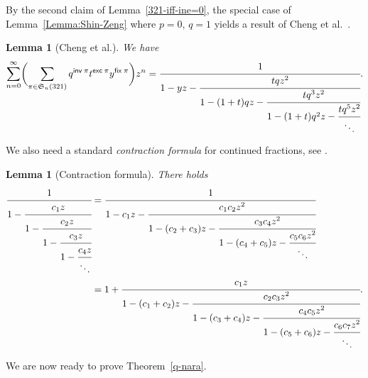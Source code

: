 \documentclass[12pt,reqno]{amsart}
\numberwithin{equation}{section}
\theoremstyle{plain}
\newtheorem{lemma}[theorem]{Lemma}
\theoremstyle{definition}
\def\S{\mathfrak{S}}
\def\D{\mathfrak{D}}
\def\exc{\mathsf{exc}}
\def\inv{\mathsf{inv}}
\def\fix{\mathsf{fix}}
\begin{document}
By the second claim of Lemma~\ref{321-iff-ine=0}, the special case of Lemma~\ref{Lemma:Shin-Zeng} where $p=0$, $q=1$ yields a result of Cheng et al.~\cite[Theorem 7.3]{CEKS}.
\begin{lemma}[Cheng et al.]\label{SZ10p_0}
We have
\begin{align}\label{CEKS}
\sum_{n=0}^{\infty} \biggl(\sum_{\pi\in \S_n(321)} q^{\inv\:\pi}t^{\exc\:\pi}y^{\fix\:\pi}\biggr)z^n
=\cfrac{1}{1-yz-\cfrac{tqz^2}{1-(1+t)qz-\cfrac{tq^3z^2}{1-(1+t)q^2z-\cfrac{tq^5z^2}{\ddots}}}}.
\end{align}
\end{lemma}

We also need a standard \emph{contraction formula} for continued fractions, see \cite[Eqs. (43) and (44)]{SZ10}.
\begin{lemma}[Contraction formula]\label{contra-formula}
There holds
\begin{align*}
\cfrac{1}{
1-\cfrac{c_{1}z}{1-\cfrac{c_{2}z}{
1-\cfrac{c_{3}z}{
1-\cfrac{c_{4}z}
{\ddots}}}}}
&=\cfrac{1}{1-c_{1}z-\cfrac{c_{1}c_{2}z^{2}}{1-(c_{2}+c_{3})z-\cfrac{c_{3}c_{4}z^{2}}{1-(c_4+c_5)z-\cfrac{c_5c_6z^2}{\ddots}}}}\\
&=1+\cfrac{c_{1}z}{1-(c_{1}+c_{2})z-\cfrac{c_{2}c_{3}z^{2}}{1-(c_{3}+c_{4})z-\cfrac{c_{4}c_{5}z^{2}}{1-(c_5+c_6)z-\cfrac{c_6c_7z^2}{\ddots}}}}.
\end{align*}
\end{lemma}

We are now ready to prove Theorem~\ref{q-nara}.
\end{document}
